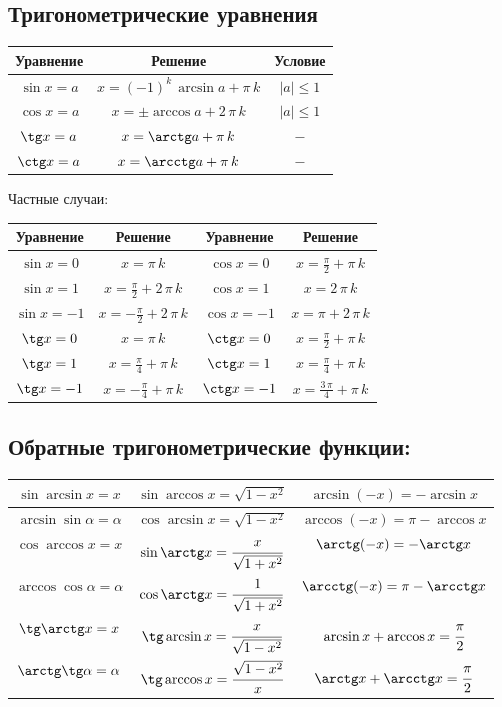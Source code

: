 \subsection{Тригонометрические уравнения}

\begin{tabular}[t]{||c|c|c||}
	\hline
		Уравнение & Решение & Условие \tabularnewline
	\hline
		$ \sin x = a $ & 	$ x = (-1)^k\, \arcsin a + \pi\, k $ & 	$ |a| \le 1 $ \tabularnewline
	\hline
		$ \cos x = a $ & 	$ x = \pm \arccos a + 2\, \pi\, k $ & 	$ |a| \le 1 $ \tabularnewline
	\hline
		$ \tg x = a $ & 	$ x = \arctg a + \pi\, k $ & 	$ - $ \tabularnewline
	\hline
		$ \ctg x = a $ & 	$ x = \arcctg a + \pi\, k $ & 	$ - $ \tabularnewline
	\hline
\end{tabular}

Частные случаи:

\begin{tabular}[t]{||c|c||c|c||}
	\hline
		Уравнение & Решение & Уравнение & Решение \tabularnewline
	\hline
		$ \sin x = 0 $ & 	$ x = \pi\, k $ & 				$ \cos x = 0 $ &	$ x = \frac{\pi}{2} + \pi\, k $ \tabularnewline
	\hline
		$ \sin x = 1 $ & 	$ x = \frac{\pi}{2} + 2\, \pi\, k $ & 	$ \cos x = 1 $ & 	$ x = 2\, \pi\, k $ \tabularnewline
	\hline
		$ \sin x = -1 $ & 	$ x = -\frac{\pi}{2} + 2\, \pi\, k $ & 	$ \cos x = -1 $ & 	$ x = \pi + 2\, \pi\, k $ \tabularnewline
	\hline
		$ \tg x = 0 $ & 	$ x = \pi\, k $ & 				$ \ctg x = 0 $ & 	$ x = \frac{\pi}{2} + \pi\, k $ \tabularnewline
	\hline
		$ \tg x = 1 $ & 	$ x = \frac{\pi}{4} + \pi\, k $ & 		$ \ctg x = 1 $ & 	$ x = \frac{\pi}{4} + \pi\, k $ \tabularnewline
	\hline
		$ \tg x = -1 $ & 	$ x = -\frac{\pi}{4} + \pi\, k $ & 		$ \ctg x = -1 $ & 	$ x = \frac{3\, \pi}{4} + \pi\, k $ \tabularnewline
	\hline
\end{tabular}

\subsection{Обратные тригонометрические функции:}

{\renewcommand{\arraystretch}{1}
\begin{tabular}[t]{||c||c||c||}
	\hline
		$ \sin\arcsin x = x $            & $ \sin\arccos x = \sqrt{1-x^2} $          & $ \arcsin(-x) = -\arcsin x $              \tabularnewline
	\hline
		$ \arcsin\sin\alpha = \alpha $   & $ \cos\arcsin x = \sqrt{1-x^2} $            & $ \arccos(-x) = \pi - \arccos x $         \tabularnewline
	\hline
	\hline
		$ \cos\arccos x = x $            & $ \sin\arctg x = \cfrac{x}{\sqrt{1+x^2}} $ & $ \arctg(-x) = -\arctg x $                \tabularnewline
	\hline
		$ \arccos\cos\alpha = \alpha $   & $ \cos\arctg x = \cfrac{1}{\sqrt{1+x^2}} $ & $ \arcctg(-x) = \pi - \arcctg x $         \tabularnewline
	\hline
	\hline
		$ \tg\arctg x = x $              & $ \tg\arcsin x = \cfrac{x}{\sqrt{1-x^2}} $ & $ \arcsin x + \arccos x = \cfrac{\pi}{2} $ \tabularnewline
	\hline
		$ \arctg\tg\alpha = \alpha $     & $ \tg\arccos x = \cfrac{\sqrt{1-x^2}}{x} $ & $ \arctg x + \arcctg x = \cfrac{\pi}{2} $  \tabularnewline
	\hline
\end{tabular}}


